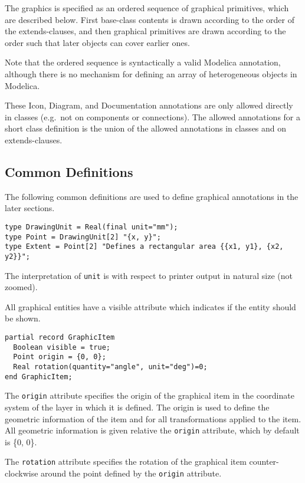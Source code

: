 The graphics is specified as an ordered sequence of graphical
primitives, which are described below. First base-class contents is
drawn according to the order of the extends-clauses, and then graphical
primitives are drawn according to the order such that later objects can
cover earlier ones.

\begin{nonnormative}
Note that the ordered sequence is syntactically a valid Modelica annotation, although there
is no mechanism for defining an array of heterogeneous objects in Modelica.
\end{nonnormative}

These Icon, Diagram, and Documentation annotations are only allowed
directly in classes (e.g.\ not on components or connections). The allowed
annotations for a short class definition is the union of the allowed
annotations in classes and on extends-clauses.

\subsection{Common Definitions}\label{common-definitions}

The following common definitions are used to define graphical
annotations in the later sections.
\begin{lstlisting}[language=modelica]
type DrawingUnit = Real(final unit="mm");
type Point = DrawingUnit[2] "{x, y}";
type Extent = Point[2] "Defines a rectangular area {{x1, y1}, {x2, y2}}";
\end{lstlisting}
The interpretation of \lstinline!unit! is with respect to printer output in
natural size (not zoomed).

All graphical entities have a visible attribute which indicates if the
entity should be shown.

\begin{lstlisting}[language=modelica]
partial record GraphicItem
  Boolean visible = true;
  Point origin = {0, 0};
  Real rotation(quantity="angle", unit="deg")=0;
end GraphicItem;
\end{lstlisting}
The \lstinline!origin! attribute specifies the origin of the graphical item in the
coordinate system of the layer in which it is defined. The origin is
used to define the geometric information of the item and for all
transformations applied to the item. All geometric information is given
relative the \lstinline!origin! attribute, which by default is \{0, 0\}.

The \lstinline!rotation! attribute specifies the rotation of the graphical item
counter-clockwise around the point defined by the \lstinline!origin! attribute.

